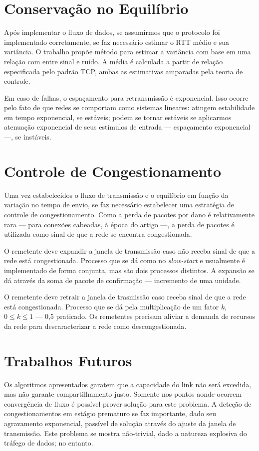 \section*{Conservação no Equilíbrio}

Após implementar o fluxo de dados, se assumirmos que o protocolo foi 
implementado corretamente, se faz necessário estimar o RTT médio e sua 
variância. O trabalho propõe método para estimar a variância com base em uma 
relação com entre sinal e ruído. A média é calculada a partir de relação 
especificada pelo padrão TCP, ambas as estimativas amparadas pela teoria de 
controle.

Em caso de falhas, o espaçamento para retransmissão é exponencial. Isso ocorre 
pelo fato de que redes se comportam como sistemas lineares: atingem 
estabilidade em tempo exponencial, se estáveis; podem se tornar estáveis se 
aplicarmos atenuação exponencial de seus estímulos de entrada --- espaçamento 
exponencial ---, se instáveis.


\section*{Controle de Congestionamento}

Uma vez estabelecidos o fluxo de transmissão e o equilíbrio em função da 
variação no tempo de envio, se faz necessário estabelecer uma estratégia de 
controle de congestionamento.
Como a perda de pacotes por dano é relativamente rara --- para conexões 
cabeadas, à época do artigo ---, a perda de pacotes é utilizada como sinal de 
que a rede se encontra congestionada.

O remetente deve expandir a janela de transmissão caso não receba sinal de que 
a rede está congestionada. Processo que se dá como no \textit{slow-start} e 
usualmente é implementado de forma conjunta, mas são dois processos distintos. 
A expansão se dá através da soma de pacote de confirmação --- incremento de uma 
unidade.

O remetente deve retrair a janela de trasmissão caso receba sinal de que a rede 
está congestionada. Processo que se dá pela multiplicação de um fator $k$, 
$0 \le k \le 1$ --- 0,5 praticado. Os remetentes precisam aliviar a demanda de 
recursos da rede para descaracterizar a rede como descongestionada.


\section*{Trabalhos Futuros}

Os algoritmos apresentados garatem que a capacidade do link não será excedida, 
mas não garante compartilhamento justo. Somente nos pontos aonde ocorrem 
convergência de fluxo é possível prover solução para este problema. A deteção 
de congestionamentos em estágio prematuro se faz importante, dado seu 
agravamento exponencial, passível de solução através do ajuste da janela de 
transmissão. Este problema se mostra não-trivial, dado a natureza explosiva do 
tráfego de dados; no entanto.
